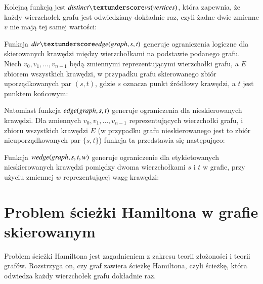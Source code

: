
\vspace{0.5cm}

Kolejną funkcją jest $\distinctvs \mli{(vertices)}$, która zapewnia, że każdy wierzchołek grafu jest odwiedziany dokładnie raz, czyli żadne dwie zmienne $v$ nie mają tej samej wartości:


\vspace{0.5cm}

Funkcja $\diredge$ generuje ograniczenia logiczne dla skierowanych krawędzi między wierzchołkami na podstawie podanego grafu. Niech $v_0, v_1, …, v_{n-1}$ będą zmiennymi reprezentującymi wierzchołki grafu, a \(E\) zbiorem wszystkich krawędzi, w przypadku grafu skierowanego zbiór uporządkowanych par $(s, t)$, gdzie \(s\) oznacza punkt źródłowy krawędzi, a \(t\) jest punktem końcowym:


\vspace{0.5cm}

Natomiast funkcja ${\mathit{edge(graph, s, t)}}$ generuje ograniczenia dla nieskierowanych krawędzi. Dla zmiennych $v_0, v_1, …, v_{n-1}$ reprezentujących wierzchołki grafu, i zbioru wszystkich krawędzi \(E\) (w przypadku grafu nieskierowanego jest to zbiór nieuporządkowanych par $\{s, t\}$) funkcja ta przedstawia się następująco:


\vspace{0.5cm}

Funkcja ${\mathit{wedge(graph, s, t, w)}}$ generuje ograniczenie dla etykietowanych nieskierowanych krawędzi pomiędzy dwoma wierzchołkami \(s\) i \(t\) w grafie, przy użyciu zmiennej \(w\) reprezentującej wagę krawędzi:



\section{Problem ścieżki Hamiltona  w grafie skierowanym}

Problem ścieżki Hamiltona jest zagadnieniem z zakresu teorii złożoności i teorii grafów. Rozstrzyga on, czy graf zawiera ścieżkę Hamiltona, czyli ścieżkę, która odwiedza każdy wierzchołek grafu dokładnie raz.

